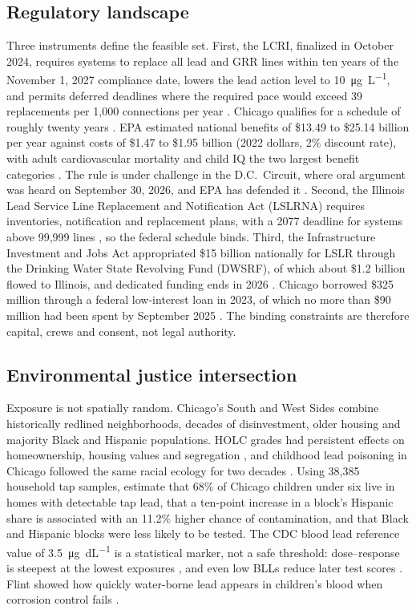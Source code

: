 \documentclass[11pt]{article}
\newcommand{\ugdl}{\si{\micro\gram\per\deci\liter}}
\begin{document}
\subsection{Regulatory landscape}
Three instruments define the feasible set. First, the LCRI, finalized in October 2024, requires
systems to replace all lead and GRR lines within ten years of the November 1, 2027 compliance
date, lowers the lead action level to \SI{10}{\micro\gram\per\liter}, and permits deferred
deadlines where the required pace would exceed 39 replacements per 1,000 connections per year
\citep{epa2024lcri}. Chicago qualifies for a schedule of roughly twenty years \citep{cob2024}. EPA
estimated national benefits of \$13.49 to \$25.14 billion per year against costs of \$1.47 to
\$1.95 billion (2022 dollars, 2\% discount rate), with adult cardiovascular mortality and child IQ
the two largest benefit categories \citep{epa2024lcri,epa2024ea}. The rule is under challenge in
the D.C.\ Circuit, where oral argument was heard on September 30, 2026, and EPA has defended it
\citep{nrdc2026}. Second, the Illinois Lead Service Line Replacement and Notification Act (LSLRNA)
requires inventories, notification and replacement plans, with a 2077 deadline for systems above
99,999 lines \citep{ilga2021lslrna,wttw2024}, so the federal schedule binds. Third, the
Infrastructure Investment and Jobs Act appropriated \$15 billion nationally for LSLR through the
Drinking Water State Revolving Fund (DWSRF), of which about \$1.2 billion flowed to Illinois, and
dedicated funding ends in 2026 \citep{icn2026cost}. Chicago borrowed \$325 million through a
federal low-interest loan in 2023, of which no more than \$90 million had been spent by September
2025 \citep{wttw2025}. The binding constraints are therefore capital, crews and consent, not
legal authority.

\subsection{Environmental justice intersection}
Exposure is not spatially random. Chicago's South and West Sides combine historically redlined
neighborhoods, decades of disinvestment, older housing and majority Black and Hispanic
populations. HOLC grades had persistent effects on homeownership, housing values and segregation
\citep{aaronson2021}, and childhood lead poisoning in Chicago followed the same racial ecology for
two decades \citep{sampson2016}. Using 38,385 household tap samples, \citet{huynh2024} estimate
that 68\% of Chicago children under six live in homes with detectable tap lead, that a ten-point
increase in a block's Hispanic share is associated with an 11.2\% higher chance of contamination, and
that Black and Hispanic blocks were less likely to be tested. The CDC blood lead reference value
of 3.5~\ugdl{} \citep{ruckart2021} is a statistical marker, not a safe threshold: dose--response
is steepest at the lowest exposures \citep{lanphear2005,bellinger2008}, and even low BLLs reduce
later test scores \citep{aizer2018}. Flint showed how quickly water-borne lead appears in
children's blood when corrosion control fails \citep{hannaattisha2016}.
\end{document}
